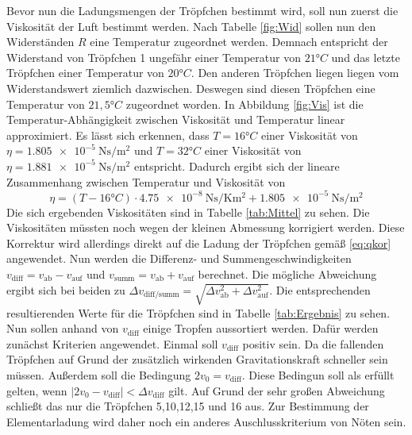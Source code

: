 \noindent Bevor nun die Ladungsmengen der Tröpfchen bestimmt wird, soll nun zuerst die Viskosität der Luft bestimmt werden.
Nach Tabelle \ref{fig:Wid} sollen nun den Widerständen $R$ eine Temperatur zugeordnet werden. Demnach entspricht der
Widerstand von Tröpfchen 1 ungefähr einer Temperatur von $21°C$ und das letzte Tröpfchen einer Temperatur von $20°C$. Den anderen Tröpfchen
liegen liegen vom Widerstandswert ziemlich dazwischen. Deswegen sind diesen Tröpfchen eine Temperatur von $21,5°C$ zugeordnet worden.
In Abbildung \ref{fig:Vis} ist die Temperatur-Abhängigkeit zwischen Viskosität und Temperatur linear approximiert.
Es lässt sich erkennen, dass $T=16°C$ einer Viskosität von $\eta=\qty{1.805e-5}{\newton\second\per\meter\squared}$
und $T=32°C$ einer Viskosität von $\eta=\qty{1.881e-5}{\newton\second\per\meter\squared}$ entspricht.
Dadurch ergibt sich der lineare Zusammenhang zwischen Temperatur und Viskosität von
\begin{equation}
    \eta=(T-16°C)\cdot \qty{4.75e-8}{\newton\second\per\kelvin\meter\squared}+\qty{1.805e-5}{\newton\second\per\meter\squared}
\end{equation}
Die sich ergebenden Viskositäten sind in Tabelle \ref{tab:Mittel} zu sehen. Die Viskositäten müssten noch wegen der kleinen Abmessung
korrigiert werden. Diese Korrektur wird allerdings direkt auf die Ladung der Tröpfchen gemäß \eqref{eq:qkor}
angewendet. Nun werden die Differenz- und Summengeschwindigkeiten $v_\text{diff}=v_\text{ab}-v_\text{auf} $ und $v_\text{summ}=v_\text{ab}+v_\text{auf}$
berechnet. Die mögliche Abweichung ergibt sich bei beiden zu $\Delta v_\text{diff/summ}=\sqrt{\Delta v_\text{ab}^2+\Delta v_\text{auf}^2}$.
Die entsprechenden resultierenden Werte für die Tröpfchen sind in Tabelle \ref{tab:Ergebnis} zu sehen.
Nun sollen anhand von $v_\text{diff}$ einige Tropfen aussortiert werden. Dafür werden zunächst Kriterien angewendet.
Einmal soll $v_\text{diff}$ positiv sein. Da die fallenden Tröpfchen auf Grund der zusätzlich wirkenden Gravitationskraft schneller sein müssen.
Außerdem soll die Bedingung $2v_0=v_\text{diff}$. Diese Bedingun soll als erfüllt gelten, wenn 
$\left|2v_0-v_\text{diff}\right|<\Delta v_\text{diff}$ gilt. Auf Grund der sehr großen Abweichung schließt das nur 
die Tröpfchen 5,10,12,15 und 16 aus. Zur Bestimmung der Elementarladung wird daher noch ein anderes Auschlusskriterium von
Nöten sein.
